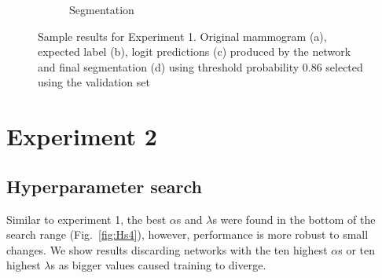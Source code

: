 \begin{figure}[h]
\begin{subfigure}{0.2\textwidth}
		\caption{Segmentation}
	\end{subfigure}%
	\caption[Qualitative results for Experiment 1]{Sample results for Experiment 1. Original mammogram (a), expected label (b), logit predictions (c) produced by the network and final segmentation (d) using threshold probability 0.86 selected using the validation set}
	\label{fig:qualitative1}
\end{figure}		



\section{Experiment 2}
\subsection{Hyperparameter search}
Similar to experiment 1, the best $\alpha$s and $\lambda$s were found in the bottom of the search range (Fig.~\ref{fig:Hs4}), however, performance is more robust to small changes. We show results discarding networks with the ten highest $\alpha$s or ten highest $\lambda$s as bigger values caused training to diverge.
